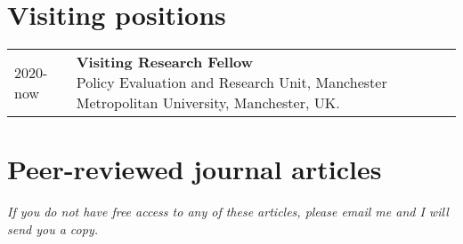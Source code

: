 \documentclass[10pt,a4paper,]{article}
\begin{document}
\hypertarget{visiting-positions}{%
\section{Visiting positions}\label{visiting-positions}}

\begin{longtable}{@{\extracolsep{\fill}}ll}
2020-now & \parbox[t]{0.85\textwidth}{%
\textbf{Visiting Research Fellow}\\[-0.1cm]{\footnotesize Policy Evaluation and Research Unit, Manchester Metropolitan University, Manchester, UK.}}\\[0.4cm]
\end{longtable}

\hypertarget{peer-reviewed-journal-articles}{%
\section{Peer-reviewed journal
articles}\label{peer-reviewed-journal-articles}}

\emph{If you do not have free access to any of these articles, please
email me and I will send you a copy.} \linebreak
\end{document}
